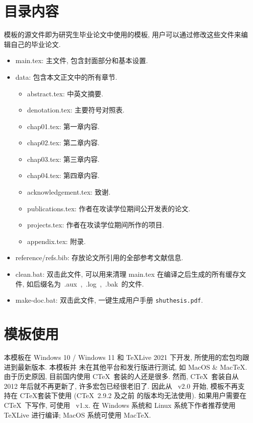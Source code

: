 \section{目录内容}
模板的源文件即为研究生毕业论文中使用的模板, 用户可以通过修改这些文件来编辑自己的毕业论文.
\begin{itemize}
\item{main.tex}: 主文件, 包含封面部分和基本设置.
\item{data}: 包含本文正文中的所有章节.
\begin{itemize}
\item{abstract.tex}: 中英文摘要.
\item{denotation.tex}: 主要符号对照表.
\item{chap01.tex}: 第一章内容.
\item{chap02.tex}: 第二章内容.
\item{chap03.tex}: 第三章内容.
\item{chap04.tex}: 第四章内容.
\item{acknowledgement.tex}: 致谢.
\item{publications.tex}: 作者在攻读学位期间公开发表的论文.
\item{projects.tex}: 作者在攻读学位期间所作的项目.
\item{appendix.tex}: 附录.
\end{itemize}
\item{reference/refs.bib}: 存放论文所引用的全部参考文献信息.
\item{clean.bat}: 双击此文件, 可以用来清理 main.tex 在编译之后生成的所有缓存文件, 
如后缀名为~.aux~,~.log~,~.bak~的文件.
\item{make-doc.bat}: 双击此文件, 一键生成用户手册 \texttt{shuthesis.pdf}.
\end{itemize}


\section{模板使用}
\label{sec:first}

本模板在 Windows 10 / Windows 11 和 \TeX Live 2021 下开发, 所使用的宏包均跟进到最新版本. 本模板并
未在其他平台和发行版进行测试, 如 MacOS \& Mac\TeX. 由于历史原因, 目前国内使用 C\TeX\ 
套装的人还是很多. 然而, C\TeX\ 套装自从 2012 年后就不再更新了, 许多宏包已经很老旧了. 
因此从 \shuthesis\ v2.0 开始, 模板不再支持在 C\TeX 套装下使用 (C\TeX\ 2.9.2 及之前
的版本均无法使用). 如果用户需要在 C\TeX\ 下写作, 可使用 \shuthesis\ v1.x. 在 Windows 
系统和 Linux 系统下作者推荐使用 \TeX Live 进行编译; MacOS 系统可使用 Mac\TeX. 










